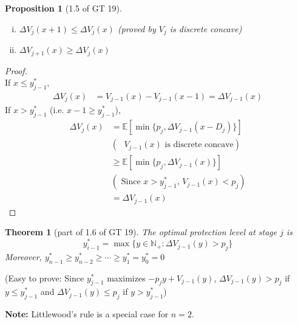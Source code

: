 \documentclass[11pt,a4paper]{article}
\newtheorem{theorem}{Theorem}
\newtheorem{proposition}{Proposition}
\begin{document}
\begin{proposition}[1.5 of GT 19]
    \quad

    \begin{enumerate}[(i)]
        \item $\Delta V_j(x+1)\leq \Delta V_j(x)$ (proved by $V_j$ is discrete concave)
        \item $\Delta V_{j+1}(x)\geq \Delta V_{j}(x)$
    \end{enumerate}
\end{proposition}
\begin{proof}
\quad\\
If $x\leq y^*_{j-1}$,
\begin{equation}
    \begin{aligned}
        \Delta V_j(x)&=V_{j-1}(x)-V_{j-1}(x-1)=\Delta V_{j-1}(x)
    \end{aligned}
    \nonumber
\end{equation}
If $x> y^*_{j-1}$ (i.e. $x-1\geq y^*_{j-1}$),
\begin{equation}
    \begin{aligned}
        \Delta V_j(x)
        &=\mathbb{E}[\min\{p_j,\Delta V_{j-1}(x-D_j)\}]\\
        &(\text{ $V_{j-1}(x)$ is discrete concave})\\
        &\geq \mathbb{E}[\min\{p_j,\Delta V_{j-1}(x)\}]\\
        &(\text{ Since $x>y_{j-1}^*$, $V_{j-1}(x)< p_j$})\\
        &=\Delta V_{j-1}(x)
    \end{aligned}
    \nonumber
\end{equation}
\end{proof}

\begin{theorem}[part of 1.6 of GT 19]
    \quad

    The optimal protection level at stage $j$ is $$y_{i-1}^*=\max\{y\in \mathbb{N}_+: \Delta V_{j-1}(y)>p_j \}$$
    Moreover, $y_{n-1}^*\geq y_{n-2}^*\geq \cdots \geq y_1^*=y_0^*=0$
\end{theorem}
(Easy to prove: Since $y_{j-1}^*$ maximizes $-p_j y+V_{j-1}(y)$, $\Delta V_{j-1}(y)> p_j$ if $y\leq y_{j-1}^*$ and $\Delta V_{j-1}(y)\leq p_j$ if $y> y_{j-1}^*$)

\textbf{Note:} Littlewood's rule is a special case for $n=2$.
\end{document}
